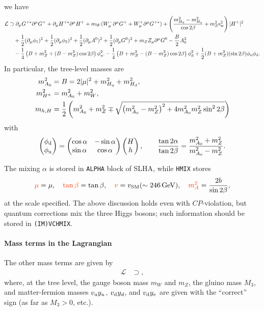 \documentclass[CheatSheet]{subfiles}
\begin{document}
we have
\begin{equation}
\begin{split}
  \mathcal L &\supset
\partial_\mu G^{+*}\partial^\mu G^+
+\partial_\mu H^{+*}\partial^\mu H^+
+m_W(W^-_\mu\partial^\mu G^+ + W^+_\mu\partial^\mu G^{+*})
+ \left(\frac{m_{\Hd}^2-m_{\Hu}^2}{\cos2\beta} + m_Z^2\sw^2\right)|H^+|^2
\\&\quad
+\frac12(\partial_\mu\phi_1)^2
+\frac12(\partial_\mu\phi_2)^2
+\frac12(\partial_\mu A^0)^2
+\frac12(\partial_\mu G^0)^2
+m_Z Z_\mu\partial^\mu G^0
-\frac{B}{2}A_0^2
\\&\quad
-\frac14\left(B+m_Z^2+(B-m_Z^2)\cos2\beta\right)\phi\w u^2.
-\frac14\left(B+m_Z^2-(B-m_Z^2)\cos2\beta\right)\phi\w d^2
+\frac12(B+m_Z^2)(\sin 2\beta)\phi\w u\phi\w d.
\end{split}
\end{equation}
In particular, the tree-level masses are
\begin{align}
 m_{A_0}^2 &= B = 2|\mu|^2+m_{\Hu}^2+m_{\Hd}^2,
\\
 m_{H^+}^2 &= m_{A_0}^2 + m_W^2,\\
 m_{h,H} &= \frac12\left(m_{A_0}^2 + m_Z^2 \mp \sqrt{\left(m_{A_0}^2-m_Z^2\right)^2+4m_{A_0}^2m_Z^2\sin^22\beta}\right)
\end{align}
with
\begin{equation}
 \pmat{\phi\w d\\\phi\w u} = \pmat{\cos\alpha&-\sin\alpha\\\sin\alpha & \cos\alpha}\pmat{H\\h},
\qquad
\frac{\tan2\alpha}{\tan2\beta} = \frac{m_{A_0}^2+m_Z^2}{m_{A_0}^2-m_Z^2}.
\end{equation}

The mixing $\alpha$ is stored in \texttt{ALPHA} block of SLHA, while \texttt{HMIX} stores
\begin{equation}
 \C{\mu}={\mu},\quad
 \C{\tan\beta}=\tan\beta,\quad
 \C{v}=v\w{SM}(\sim246\GeV),\quad
 \C{m_A^2}=\frac{2b}{\sin2\beta},
\end{equation}
at the scale specified.
The above discussion holds even with $CP$-violation, but quantum corrections mix the three Higgs bosons; such information should be stored in \texttt{(IM)VCHMIX}.


\paragraph{Mass terms in the Lagrangian}
The other mass terms are given by
\begin{equation}
 \begin{split}
\mathcal L&\supset
   ,
 \end{split}\label{eq:lag-massterms}
\end{equation}
where, at the tree level, the gauge boson mass $m_W$ and $m_Z$, the gluino mass $M_3$, and matter-fermion masses $\vu\yu$, $\vd\yd$, and $\vd\ye$ are given with the ``correct'' sign (as far as $M_3>0$, etc.).
\end{document}

